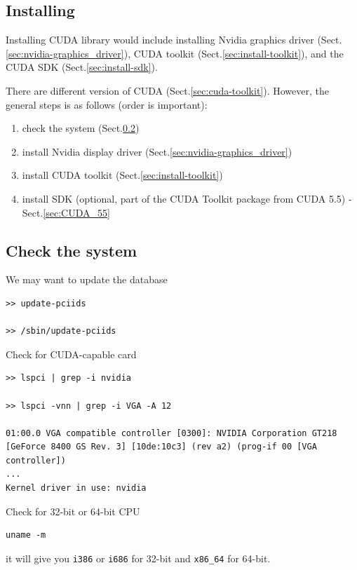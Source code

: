 \subsection{Installing}
\label{sec:installing}

Installing CUDA library would include installing Nvidia graphics driver
(Sect.\ref{sec:nvidia-graphics_driver}), CUDA toolkit
(Sect.\ref{sec:install-toolkit}), and the CUDA SDK (Sect.\ref{sec:install-sdk}).

There are different version of CUDA (Sect.\ref{sec:cuda-toolkit}). However,
the general steps is as follows (order is important):
\begin{enumerate}
\item check the system (Sect.\ref{sec:check-system})
\item install Nvidia display driver (Sect.\ref{sec:nvidia-graphics_driver})
\item install CUDA toolkit (Sect.\ref{sec:install-toolkit})
\item install SDK (optional, part of the CUDA Toolkit package from CUDA 5.5) - Sect.\ref{sec:CUDA_55}
\end{enumerate}


\subsection{Check the system}
\label{sec:check-system}


We may want to update the database
\begin{verbatim}
>> update-pciids

>> /sbin/update-pciids
\end{verbatim}

Check for CUDA-capable card
\begin{verbatim}
>> lspci | grep -i nvidia

>> lspci -vnn | grep -i VGA -A 12

01:00.0 VGA compatible controller [0300]: NVIDIA Corporation GT218 [GeForce 8400 GS Rev. 3] [10de:10c3] (rev a2) (prog-if 00 [VGA controller])
...
Kernel driver in use: nvidia
\end{verbatim}

Check for 32-bit or 64-bit CPU
\begin{verbatim}
uname -m 
\end{verbatim}
it will give you \verb!i386! or \verb!i686! for 32-bit and
\verb!x86_64! for 64-bit.

